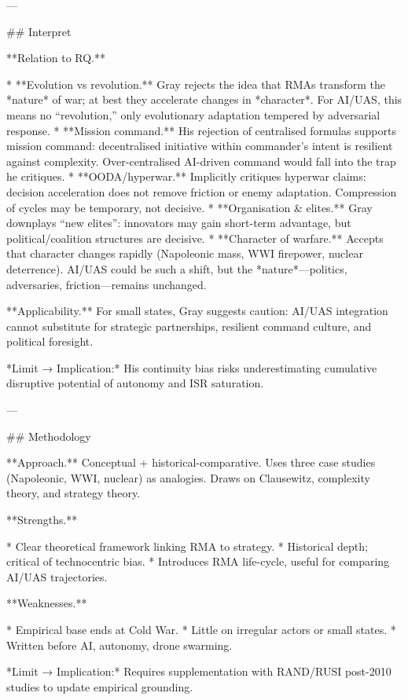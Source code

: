 ---

## Interpret

**Relation to RQ.**

* **Evolution vs revolution.** Gray rejects the idea that RMAs transform the *nature* of war; at best they accelerate changes in *character*. For AI/UAS, this means no “revolution,” only evolutionary adaptation tempered by adversarial response.
* **Mission command.** His rejection of centralised formulas supports mission command: decentralised initiative within commander’s intent is resilient against complexity. Over-centralised AI-driven command would fall into the trap he critiques.
* **OODA/hyperwar.** Implicitly critiques hyperwar claims: decision acceleration does not remove friction or enemy adaptation. Compression of cycles may be temporary, not decisive.
* **Organisation & elites.** Gray downplays “new elites”: innovators may gain short-term advantage, but political/coalition structures are decisive.
* **Character of warfare.** Accepts that character changes rapidly (Napoleonic mass, WWI firepower, nuclear deterrence). AI/UAS could be such a shift, but the *nature*—politics, adversaries, friction—remains unchanged.

**Applicability.**
For small states, Gray suggests caution: AI/UAS integration cannot substitute for strategic partnerships, resilient command culture, and political foresight.

*Limit → Implication:* His continuity bias risks underestimating cumulative disruptive potential of autonomy and ISR saturation.

---

## Methodology

**Approach.** Conceptual + historical-comparative. Uses three case studies (Napoleonic, WWI, nuclear) as analogies. Draws on Clausewitz, complexity theory, and strategy theory.

**Strengths.**

* Clear theoretical framework linking RMA to strategy.
* Historical depth; critical of technocentric bias.
* Introduces RMA life-cycle, useful for comparing AI/UAS trajectories.

**Weaknesses.**

* Empirical base ends at Cold War.
* Little on irregular actors or small states.
* Written before AI, autonomy, drone swarming.

*Limit → Implication:* Requires supplementation with RAND/RUSI post-2010 studies to update empirical grounding.

